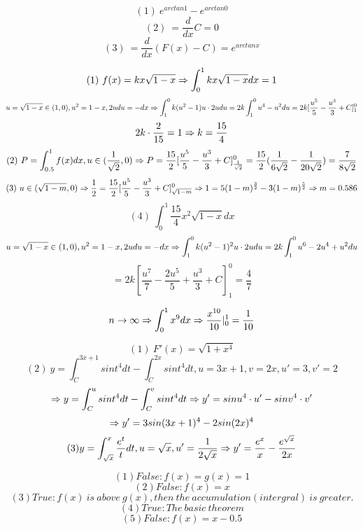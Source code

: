 \documentclass{homework}
\begin{document}
\question 

$$ (1) \ e^{arctan1} - e^{arctan0}
$$
$$ (2) \ = \frac{d}{dx}C = 0
$$
$$ (3) \ = \frac{d}{dx}(F(x) - C) = e^{arctanx}
$$

\question

$$(1) \ f(x) = kx\sqrt{1 - x} \Rightarrow \int_{0}^{1}{kx\sqrt{1 - x}}dx = 1
$$
$$ u = \sqrt{1 - x} \in (1, 0), u^2 = 1 - x, 2u du = - dx \Rightarrow \int_{1}^{0}{k(u^2 - 1)u \cdot 2u}du = 2k \int_{1}^{0}{u^4 - u^2}du = 2k[\frac{u^5}{5} - \frac{u^3}{3} + C]_1^0
$$
$$ 2k \cdot \frac{2}{15} = 1 \Rightarrow k = \frac{15}{4}
$$
$$(2) \ P = \int_{0.5}^{1}f(x)dx, u \in (\frac{1}{\sqrt{2}}, 0) \Rightarrow P = \frac{15}{2}[\frac{u^5}{5} - \frac{u^3}{3} + C]_\frac{1}{\sqrt{2}}^0 = \frac{15}{2}(\frac{1}{6\sqrt{2}} - \frac{1}{20\sqrt{2}}) = \frac{7}{8\sqrt{2}}
$$
$$(3) \ u \in (\sqrt{1 - m}, 0) \Rightarrow \frac{1}{2} = \frac{15}{2}[\frac{u^5}{5} - \frac{u^3}{3} + C]_{\sqrt{1 - m}}^0 \Rightarrow 1 = 5(1 - m)^\frac{3}{2} - 3(1 - m)^\frac{5}{2} \Rightarrow m = 0.586
$$
$$(4) \ \int_{0}^{1}{\frac{15}{4}x^2\sqrt{1 - x}}dx
$$
$$ u = \sqrt{1 - x} \in (1, 0), u^2 = 1 - x, 2u du = - dx \Rightarrow \int_{1}^{0}{k(u^2 - 1)^2u \cdot 2u}du = 2k \int_{1}^{0}{u^6 - 2u^4 + u^2}du 
$$
$$ = 2k[\frac{u^7}{7} - \frac{2u^5}{5} + \frac{u^3}{3} + C]_1^0 = \frac{4}{7}
$$

\question

$$ n \rightarrow \infty \Rightarrow \int_{0}^{1}{x^9}dx \Rightarrow \frac{x^{10}}{10}|_{0}^{1} = \frac{1}{10}
$$

\question

$$(1) \ F'(x) = \sqrt{1 + x^4}
$$
$$(2) \ y = \int_{C}^{3x + 1}sint^4dt - \int_{C}^{2x}sint^4dt, u = 3x + 1, v = 2x, u' = 3, v' = 2
$$
$$ \Rightarrow y = \int_{C}^{u}sint^4dt - \int_{C}^{v}sint^4dt \Rightarrow y' = sinu^4 \cdot u' - sinv^4 \cdot v'
$$
$$ \Rightarrow y' = 3sin(3x + 1)^4 - 2sin(2x)^4
$$
$$(3) y = \int_{\sqrt{x}}^{x}{\frac{e^t}{t}}dt, u = \sqrt{x}, u' = \frac{1}{2\sqrt{x}} \Rightarrow y' = \frac{e^x}{x} - \frac{e^{\sqrt{x}}}{2x}
$$

\question

$$(1) False: f(x) = g(x) = 1
$$
$$(2) False: f(x) = x
$$
$$(3) True: f(x) \ is \ above \ g(x), then \ the \ accumulation(intergral) \ is \ greater.
$$
$$(4) True: The \ basic \ theorem
$$
$$(5) False: f(x) = x - 0.5
$$
\end{document}
